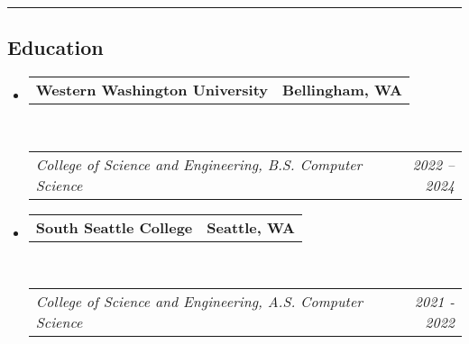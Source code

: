 \documentclass[10pt,letterpaper]{article}
\makeatletter
\newcommand{\headerrow}[2]
{\begin{tabular*}{\linewidth}{l@{\extracolsep{\fill}}r}
	#1 &
	#2 \\
\end{tabular*}}
\makeatother
\begin{document}
\begin{itemize}
\end{itemize}


\hrule
\vspace{-0.4em}
\subsection*{Education}

\begin{itemize}
    \parskip=0.1em

    \item
          \headerrow
          {\textbf{Western Washington University}}
          {\textbf{Bellingham, WA}}
          \\
          \headerrow
          {\emph{College of Science and Engineering, B.S. Computer Science}}
          {\emph{2022 -- 2024}}
    \item
          \headerrow
          {\textbf{South Seattle College}}
          {\textbf{Seattle, WA}}
          \\
          \headerrow
          {\emph{College of Science and Engineering, A.S. Computer Science}}
          {\emph{2021 - 2022}}
\end{itemize}
\end{document}
